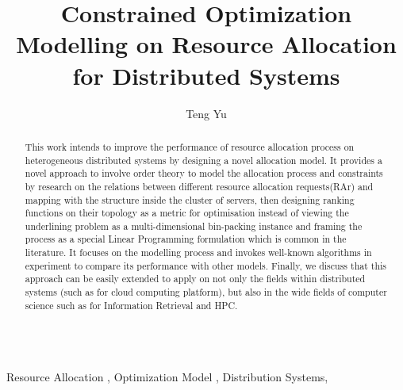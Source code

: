 \documentclass{elsarticle}
\begin{document}
\begin{frontmatter}

\title{Constrained Optimization Modelling on Resource Allocation for Distributed Systems}

\author{Teng Yu}

\address{Distributed Software Engineering Section\\Department of Computing\\
  Imperial College of Science, Technology and Medicine}



\begin{abstract}
This work intends to improve the performance of resource allocation process on heterogeneous distributed systems by designing a novel allocation model. It provides a novel approach to involve order theory to model the allocation process and constraints by research on the relations between different resource allocation requests(RAr) and mapping with the structure inside the cluster of servers, then designing ranking functions on their topology as a metric for optimisation instead of viewing the underlining problem as a multi-dimensional bin-packing instance and framing the process as a special Linear Programming formulation which is common in the literature. It focuses on the modelling process and invokes well-known algorithms in experiment to compare its performance with other models. Finally, we discuss that this approach can be easily extended to apply on not only the fields within distributed systems (such as for cloud computing platform), but also in the wide fields of computer science such as for Information Retrieval and HPC.\\\\


\end{abstract}

\begin{keyword}
  Resource Allocation \sep
  Optimization Model \sep
  Distribution Systems\sep 


\end{keyword}

\end{frontmatter}
\end{document}
